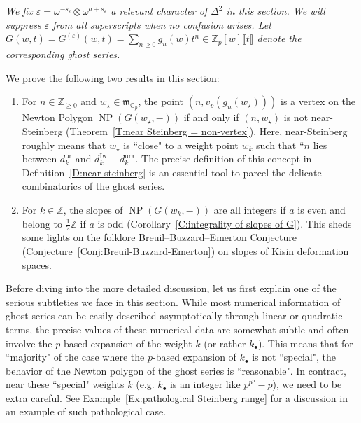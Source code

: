 \documentclass[12pt]{amsart}
\theoremstyle{definition}
\numberwithin{equation}{subsection}
\def\gothm{\mathfrak{m}}
\def\CC{\mathbb{C}}
\def\ZZ{\mathbb{Z}}
\DeclareMathOperator{\NP}{NP}
\newcommand{\Iw}{\mathrm{Iw}}
\newcommand{\unr}{\mathrm{ur}}
\begin{document}
\emph{We fix  $\varepsilon = \omega^{-s_\varepsilon} \otimes \omega^{a+s_\varepsilon}$ a relevant character of $\Delta^2$ in this section. We will suppress $\varepsilon$ from all superscripts when no confusion arises. Let $G(w,t) = G^{(\varepsilon)}(w,t) = \sum_{n\geq 0} g_n(w) t^n \in \ZZ_p[w]\llbracket t\rrbracket$ denote the corresponding ghost series.}

\medskip
We prove the following two results in this section:
\begin{enumerate}
\item For $n \in \ZZ_{\geq 0}$ and $w_\star \in \gothm_{\CC_p}$, the point $(n, v_p(g_n(w_\star)))$ is a vertex on the Newton Polygon $\NP(G(w_\star, -))$ if and only if $(n, w_\star)$ is not near-Steinberg (Theorem~\ref{T:near Steinberg = non-vertex}). Here, near-Steinberg roughly means that $w_\star$ is ``close" to a weight point $w_k$ such that ``$n$ lies between $d_k^\unr$ and $d_k^\Iw-d_k^\unr$".
The precise definition of this concept in Definition~\ref{D:near steinberg} is an essential tool to parcel the delicate combinatorics of the ghost series.

\item For $k \in \ZZ$, the slopes of $\NP(G(w_k,-))$ are all integers if $a$ is even and belong to $\frac 12\ZZ$ if $a$ is odd (Corollary~\ref{C:integrality of slopes of G}). This sheds some lights on the folklore Breuil--Buzzard--Emerton Conjecture (Conjecture~\ref{Conj:Breuil-Buzzard-Emerton}) on slopes of Kisin deformation spaces.
\end{enumerate}

Before diving into the more detailed discussion, let us first explain one of the serious subtleties we face in this section.  While most numerical information of ghost series can be easily described asymptotically through linear or quadratic terms, the precise values of these numerical data are somewhat subtle and often involve the $p$-based expansion of the weight $k$ (or rather $k_\bullet$). This means that for ``majority" of the case where the $p$-based expansion of $k_\bullet$ is not ``special", the behavior of the Newton polygon of the ghost series is ``reasonable". In contract, near these ``special" weights $k$ (e.g. $k_\bullet$ is an integer like $p^{p^p}-p$), we need to be extra careful.  See Example~\ref{Ex:pathological Steinberg range} for a discussion in an example of such pathological case.
\end{document}
